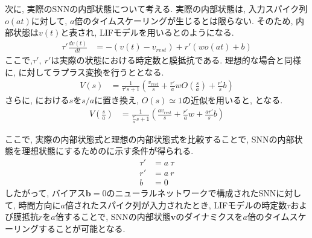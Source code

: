 次に, 実際のSNNの内部状態について考える.
実際の内部状態は, 入力スパイク列$o(at)$に対して, $a$倍のタイムスケーリングが生じるとは限らない.
そのため, 内部状態は$v(t)$と表され, LIFモデルを用いるとのようになる.
\begin{equation}
    \begin{split}
        \tau' \frac{dv(t)}{dt} &= -(v(t)-v_{rest}) + r'(w o(at) + b)
    \end{split}
    \label{sec2:eq:actual}
\end{equation}
ここで,$\tau',~r'$は実際の状態における時定数と膜抵抗である.
理想的な場合と同様に, に対してラプラス変換を行うととなる.
\begin{equation}
    \begin{split}
        V(s) &= \frac{1}{\tau' s+1}(\frac{v_{rest}}{s}+\frac{r'}{a} w O(\frac{s}{a})+\frac{r'}{s}b)
    \end{split}
    \label{sec2:eq:actual_laplace}
\end{equation}
さらに, における$s$を$s/a$に置き換え, $O(s)\simeq1$の近似を用いると, となる.
\begin{equation}
    \begin{split}
        V(\frac{s}{a}) &= \frac{1}{\frac{\tau'}{a} s+1}(\frac{av_{rest}}{s}+\frac{r'}{a} w+\frac{a r'}{s}b)
    \end{split}
    \label{sec2:eq:actual_laplace2}
\end{equation}

ここで, 実際の内部状態式と理想の内部状態式を比較することで, SNNの内部状態を理想状態にするためのに示す条件が得られる.
\begin{equation}
    \begin{split}
        \tau'&=a ~\tau\\
        r'&=a~r \\
        b&=0
    \end{split}
    \label{sec2:eq:condition}
\end{equation}
したがって, バイアス$\bm{b}=0$のニューラルネットワークで構成されたSNNに対して, 時間方向に$a$倍されたスパイク列が入力されたとき, LIFモデルの時定数$\tau$および膜抵抗$r$を$a$倍することで, SNNの内部状態$\bm{v}$のダイナミクスを$a$倍のタイムスケーリングすることが可能となる.


